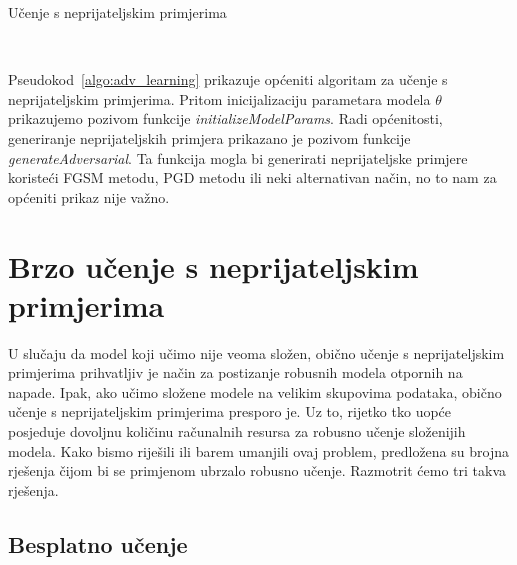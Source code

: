 \documentclass[times, utf8, zavrsni, numeric]{fer}
\begin{document}
\begin{algorithm}
    \caption{Učenje s neprijateljskim primjerima}
    \label{algo:adv_learning}
    \begin{algorithmic}
        \\\hrulefill
            \ENDFOR
        \ENDFOR
    \end{algorithmic}
\end{algorithm}

Pseudokod~\ref{algo:adv_learning} prikazuje općeniti algoritam za učenje s neprijateljskim primjerima.
Pritom inicijalizaciju parametara modela $\theta$ prikazujemo pozivom funkcije \textit{initializeModelParams}.
Radi općenitosti, generiranje neprijateljskih primjera prikazano je pozivom funkcije \textit{generateAdversarial}.
Ta funkcija mogla bi generirati neprijateljske primjere koristeći FGSM metodu, PGD metodu ili neki alternativan način, no to nam za općeniti prikaz nije važno.

\section{Brzo učenje s neprijateljskim primjerima}

U slučaju da model koji učimo nije veoma složen, obično učenje s neprijateljskim primjerima prihvatljiv je način za postizanje robusnih modela otpornih na napade.
Ipak, ako učimo složene modele na velikim skupovima podataka, obično učenje s neprijateljskim primjerima presporo je. 
Uz to, rijetko tko uopće posjeduje dovoljnu količinu računalnih resursa za robusno učenje složenijih modela.
Kako bismo riješili ili barem umanjili ovaj problem, predložena su brojna rješenja čijom bi se primjenom ubrzalo robusno učenje. Razmotrit ćemo tri takva rješenja.

\pagebreak

\subsection{Besplatno učenje}
\end{document}
